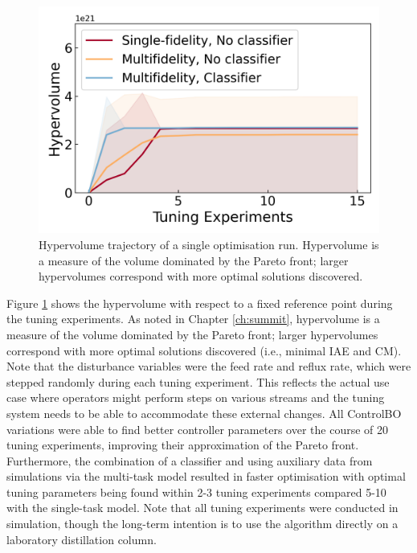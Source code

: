 \begin{figure}
    \centering
    \includegraphics[width=\textwidth]{gfx/Chapter06/hypervolume_comparison.png}
    \caption{Hypervolume trajectory of a single optimisation run. Hypervolume is a measure of the volume dominated by the Pareto front; larger hypervolumes correspond with more optimal solutions discovered.}
    \label{fig:hypervolume_comparison}
\end{figure}

Figure \ref{fig:hypervolume_comparison} shows the hypervolume with respect to a fixed reference point during the tuning experiments. As noted in Chapter \ref{ch:summit}, hypervolume is a measure of the volume dominated by the Pareto front; larger hypervolumes correspond with more optimal solutions discovered (i.e., minimal IAE and CM). Note that the disturbance variables were the feed rate and reflux rate, which were stepped randomly during each tuning experiment. This reflects the actual use case where operators might perform steps on various streams and the tuning system needs to be able to accommodate these external changes.  All ControlBO variations were able to find better controller parameters over the course of 20 tuning experiments, improving their approximation of the Pareto front. Furthermore, the combination of a classifier and using auxiliary data from simulations via the multi-task model resulted in faster optimisation with optimal tuning parameters being found within 2-3 tuning experiments compared 5-10 with the single-task model.  Note that all tuning experiments were conducted in simulation, though the long-term intention is to use the algorithm directly on a laboratory distillation column.

